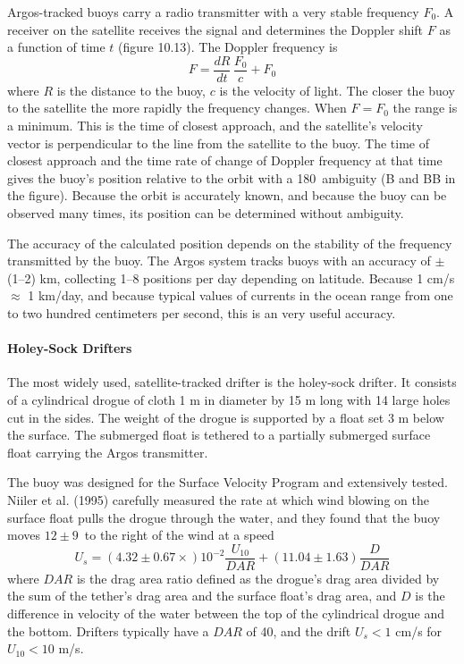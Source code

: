 Argos-tracked buoys carry a radio transmitter with a very stable
frequency $F_0$. A receiver on the satellite receives the signal and
determines the Doppler shift $F$ as a function of time $t$ (figure
10.13). The Doppler frequency is
\begin{displaymath}
F=\frac{dR}{dt}\,\frac{F_0}{c} + F_0
\end{displaymath}
where $R$ is the distance to the buoy, $c$ is the velocity of
light. The closer the buoy to the satellite the more rapidly the
frequency changes. When $F = F_0$ the range is a minimum. This is the
time of closest approach, and the satellite's velocity vector is
perpendicular to the line from the satellite to the buoy. The time of
closest approach and the time rate of change of Doppler frequency at
that time gives the buoy's position relative to the orbit with a
180\degrees\ ambiguity (B and BB in the figure). Because the orbit is
accurately known, and because the buoy can be observed many times, its
position can be determined without ambiguity.

The accuracy of the calculated position depends
on the stability of the frequency transmitted by the buoy. The Argos
system tracks buoys with an
accuracy of
$\pm$(1--2) km, collecting 1--8 positions per day depending on
latitude. Because 1 cm/s $\approx$ 1 km/day, and because typical
values of currents in the ocean range from one to two hundred
centimeters per second, this is an very useful accuracy.

\paragraph{Holey-Sock Drifters}
The most widely used,
satellite-tracked drifter is the holey-sock drifter. It consists of a
cylindrical drogue of cloth 1 m in diameter by 15 m long with 14 large
holes cut in the sides. The weight of the drogue is supported by a
float set 3 m below the surface. The submerged float is tethered to a
partially submerged surface float carrying the Argos transmitter.

The buoy was designed for the Surface Velocity Program and extensively
tested. Niiler et al. (1995) carefully measured the rate at which wind
blowing on the surface float pulls the drogue through the water, and
they found that the buoy moves $12\pm9$\degrees\ to the right of the
wind at a speed
\begin{equation}
U_s = \left( 4.32\pm 0.67 \times\right) 10^{-2} \frac{U_{10}}{DAR} +
\left( 11.04\pm 1.63 \right) \frac{D}{DAR}
\end{equation}
where $DAR$ is the drag area ratio defined as the drogue's drag area
divided by the sum of the tether's drag area and the surface float's
drag area, and $D$ is the difference in velocity of the water between
the top of the cylindrical drogue and the bottom. Drifters typically
have a $DAR$ of 40, and the drift $U_s < 1$ cm/s for $U_{10} < 10$
m/s.

